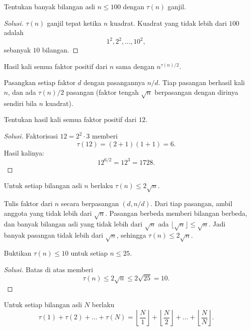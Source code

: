 \documentclass[12pt]{scrartcl}
\begin{document}
\begin{example}
Tentukan banyak bilangan asli $n \le 100$ dengan $\tau(n)$ ganjil.
\end{example}
\begin{proof}[Solusi]
$\tau(n)$ ganjil tepat ketika $n$ kuadrat.
Kuadrat yang tidak lebih dari $100$ adalah
\[ 1^2, 2^2, \dots, 10^2, \]
sebanyak $10$ bilangan.
\end{proof}

\begin{fact}
Hasil kali semua faktor positif dari $n$ sama dengan $n^{\tau(n)/2}$.
\end{fact}

Pasangkan setiap faktor $d$ dengan pasangannya $n/d$.
Tiap pasangan berhasil kali $n$, dan ada $\tau(n)/2$ pasangan
(faktor tengah $\sqrt{n}$ berpasangan dengan dirinya sendiri bila $n$ kuadrat).

\begin{example}
Tentukan hasil kali semua faktor positif dari $12$.
\end{example}
\begin{proof}[Solusi]
Faktorisasi $12 = 2^2 \cdot 3$ memberi
\[ \tau(12) = (2 + 1)(1 + 1) = 6. \]
Hasil kalinya:
\[ 12^{6/2} = 12^3 = 1728. \]
\end{proof}

\begin{fact}
Untuk setiap bilangan asli $n$ berlaku $\tau(n) \le 2\sqrt{n}$.
\end{fact}

Tulis faktor dari $n$ secara berpasangan $(d, n/d)$.
Dari tiap pasangan, ambil anggota yang tidak lebih dari $\sqrt{n}$.
Pasangan berbeda memberi bilangan berbeda, dan banyak bilangan asli yang
tidak lebih dari $\sqrt{n}$ ada $\lfloor \sqrt{n} \rfloor \le \sqrt{n}$.
Jadi banyak pasangan tidak lebih dari $\sqrt{n}$, sehingga $\tau(n) \le 2\sqrt{n}$.

\begin{example}
Buktikan $\tau(n) \le 10$ untuk setiap $n \le 25$.
\end{example}
\begin{proof}[Solusi]
Batas di atas memberi
\[ \tau(n) \le 2\sqrt{n} \le 2\sqrt{25} = 10. \]
\end{proof}

\begin{lemma}
Untuk setiap bilangan asli $N$ berlaku
\[ \tau(1) + \tau(2) + \dots + \tau(N) =
\left\lfloor \frac{N}{1} \right\rfloor + \left\lfloor \frac{N}{2} \right\rfloor
+ \dots + \left\lfloor \frac{N}{N} \right\rfloor. \]
\end{lemma}
\end{document}
